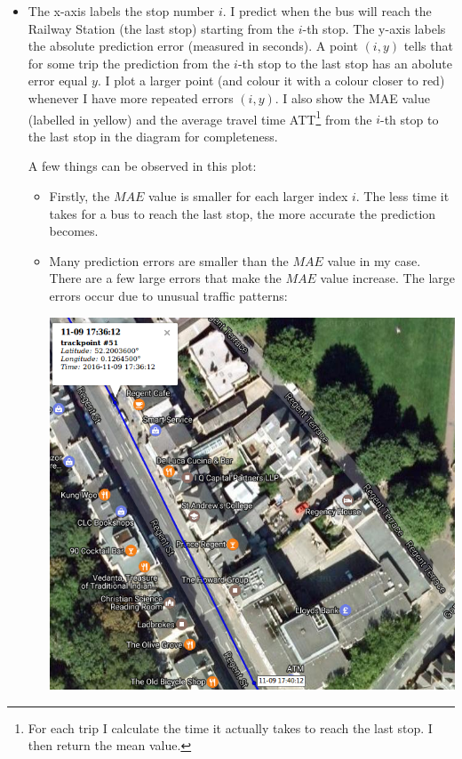 \documentclass[12pt,a4paper,oneside,openright]{report}
\begin{document}
\begin{itemize}

\item[]
   The x-axis labels the stop number $i$. I predict when the bus
   will reach the Railway Station (the last stop) starting from the $i$-th stop.
   The y-axis labels the absolute prediction error (measured in seconds).
   A point $(i, y)$ tells that for some trip the prediction from the $i$-th stop
   to the last stop has an abolute error equal $y$. I plot a larger point (and colour it
   with a colour closer to red) whenever I have more repeated errors $(i, y)$.
   I also show the MAE value (labelled in yellow) and the 
   average travel time ATT\footnote{For each trip I calculate the time it actually
   takes to reach the last stop. I then return the mean value.} from the $i$-th stop
   to the last stop in the diagram for completeness.

   A few things can be observed in this plot:
   
\begin{itemize} 
   
   \item 
   Firstly, the $MAE$ value is smaller
   for each larger index $i$. The less time it takes for a bus to reach the last
   stop, the more accurate the prediction becomes.

   \item
   Many prediction errors are smaller than the $MAE$ value in my case.
   There are a few large errors that make the $MAE$ value increase. The large errors
   occur due to unusual traffic patterns:

   \includegraphics[scale=0.6]{figs/unusual_pattern.png} \\


\end{itemize}
\end{itemize}
\end{document}
